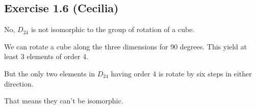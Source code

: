 \subsection*{Exercise 1.6 (Cecilia)}
No, $D_{24}$ is not isomorphic to the group of rotation of a cube.

We can rotate a cube along the three dimensions for 90 degrees. This yield at least 3 elements of order 4.

But the only two elements in $D_{24}$ having order 4 is rotate by six steps in either direction.

That means they can't be isomorphic.